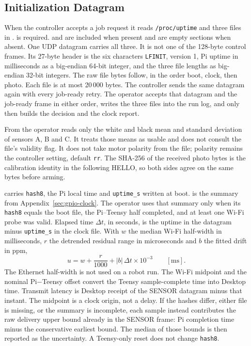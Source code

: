 \subsection{Initialization Datagram}
\label{sec:init-datagram}
When the controller accepts a job request it reads \texttt{/proc/uptime} and three files in .  is required.  and  are included when present and are empty sections when absent. One UDP datagram carries all three. It is not one of the 128-byte control frames. Its 27-byte header is the six characters \texttt{LFINIT}, version 1, Pi uptime in milliseconds as a big-endian 64-bit integer, and the three file lengths as big-endian 32-bit integers. The raw file bytes follow, in the order boot, clock, then photo. Each file is at most 20\,000 bytes. The controller sends the same datagram again with every job-ready retry. The operator accepts that datagram and the job-ready frame in either order, writes the three files into the run log, and only then builds the decision and the clock report.

From  the operator reads only the white and black mean and standard deviation of sensors A, B and C. It treats those means as usable and does not consult the file's validity flag. It does not take motor polarity from the file; polarity remains the controller setting, default \texttt{rr}. The SHA-256 of the received photo bytes is the calibration identity in the following HELLO, so both sides agree on the same bytes before arming.

 carries \texttt{hash8}, the Pi local time and \texttt{uptime\_s} written at boot.  is the summary from Appendix~\ref{sec:gpio-clock}. The operator uses that summary only when its \texttt{hash8} equals the boot file, the Pi--Teensy half completed, and at least one Wi-Fi probe was valid. Elapsed time $\Delta t$, in seconds, is the uptime in the datagram minus \texttt{uptime\_s} in the clock file. With $w$ the median Wi-Fi half-width in milliseconds, $r$ the detrended residual range in microseconds and $b$ the fitted drift in ppm,
\begin{equation}
u = w + \frac{r}{1000} + |b|\,\Delta t \times 10^{-3}
\qquad[\mathrm{ms}].
\label{eq:transmit-uncertainty}
\end{equation}
The Ethernet half-width is not used on a robot run. The Wi-Fi midpoint and the nominal Pi$-$Teensy offset convert the Teensy sample-complete time into Desktop time. Transmit latency is Desktop receipt of the SENSOR datagram minus that instant. The midpoint is a clock origin, not a delay. If the hashes differ, either file is missing, or the summary is incomplete, each sample instead contributes the raw delivery upper bound already in the SENSOR frame: Pi completion time minus the conservative earliest bound. The median of those bounds is then reported as the uncertainty. A Teensy-only reset does not change \texttt{hash8}.

